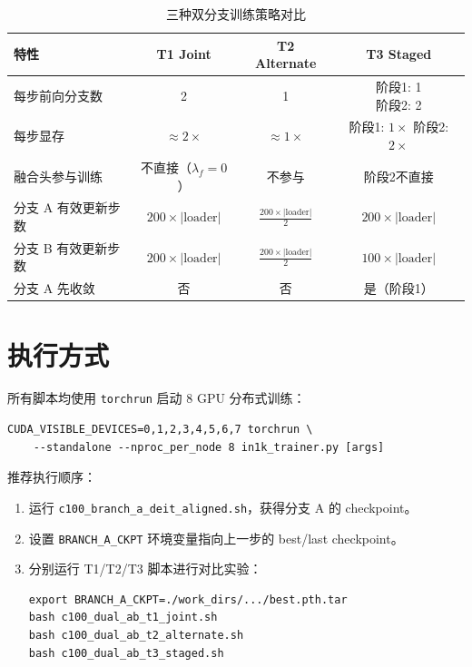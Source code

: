 \documentclass[a4paper,11pt]{article}
\begin{document}
\begin{table}[h]
\centering
\caption{三种双分支训练策略对比}
\begin{tabular}{l c c c}
\toprule
\textbf{特性} & \textbf{T1 Joint} & \textbf{T2 Alternate} & \textbf{T3 Staged} \\
\midrule
每步前向分支数 & 2 & 1 & \makecell{阶段1: 1 \\ 阶段2: 2} \\
每步显存 & $\approx 2\times$ & $\approx 1\times$ & \makecell{阶段1: $1\times$ \\ 阶段2: $2\times$} \\
融合头参与训练 & 不直接（$\lambda_f=0$） & 不参与 & 阶段2不直接 \\
分支 A 有效更新步数 & $200 \times |\text{loader}|$ & $\frac{200 \times |\text{loader}|}{2}$ & $200 \times |\text{loader}|$ \\
分支 B 有效更新步数 & $200 \times |\text{loader}|$ & $\frac{200 \times |\text{loader}|}{2}$ & $100 \times |\text{loader}|$ \\
分支 A 先收敛 & 否 & 否 & 是（阶段1） \\
\bottomrule
\end{tabular}
\end{table}

\section{执行方式}

所有脚本均使用 \texttt{torchrun} 启动 8 GPU 分布式训练：

\begin{verbatim}
CUDA_VISIBLE_DEVICES=0,1,2,3,4,5,6,7 torchrun \
    --standalone --nproc_per_node 8 in1k_trainer.py [args]
\end{verbatim}

推荐执行顺序：
\begin{enumerate}
    \item 运行 \texttt{c100\_branch\_a\_deit\_aligned.sh}，获得分支 A 的 checkpoint。
    \item 设置 \texttt{BRANCH\_A\_CKPT} 环境变量指向上一步的 best/last checkpoint。
    \item 分别运行 T1/T2/T3 脚本进行对比实验：
    \begin{verbatim}
export BRANCH_A_CKPT=./work_dirs/.../best.pth.tar
bash c100_dual_ab_t1_joint.sh
bash c100_dual_ab_t2_alternate.sh
bash c100_dual_ab_t3_staged.sh
    \end{verbatim}
\end{enumerate}
\end{document}
